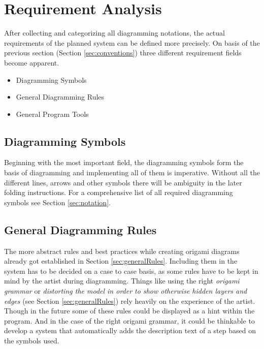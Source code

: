 
\section{Requirement Analysis}
\label{sec:requirementAnalysis}

After collecting and categorizing all diagramming notations, the actual requirements of the planned system can be defined more precisely. On basis of the previous section (Section \ref{sec:conventions}) three different requirement fields become apparent.

\begin{itemize}
	\item Diagramming Symbols
	\item General Diagramming Rules
	\item General Program Tools
\end{itemize}

\subsection{Diagramming Symbols}

Beginning with the most important field, the diagramming symbols form the basis of diagramming and implementing all of them is imperative. Without all the different lines, arrows and other symbols there will be ambiguity in the later folding instructions. For a comprehensive list of all required diagramming symbols see Section \ref{sec:notation}.

\subsection{General Diagramming Rules}

The more abstract rules and best practices while creating origami diagrams already got established in Section \ref{sec:generalRules}. Including them in the system has to be decided on a case to case basis, as some rules have to be kept in mind by the artist during diagramming. Things like using the right \emph{origami grammar} or \emph{distorting the model in order to show otherwise hidden layers and edges} (see Section \ref{sec:generalRules}) rely heavily on the experience of the artist.\\
Though in the future some of these rules could be displayed as a hint within the program. And in the case of the right origami grammar, it could be thinkable to develop a system that automatically adds the description text of a step based on the symbols used.

